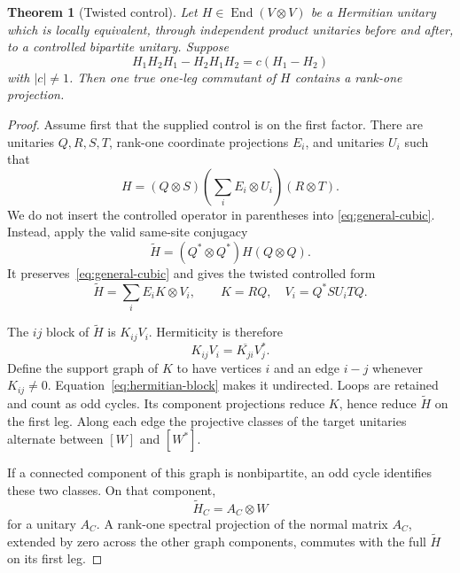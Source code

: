\documentclass[11pt]{article}
\newtheorem{theorem}{Theorem}[section]
\theoremstyle{definition}
\theoremstyle{remark}
\newcommand{\End}{\operatorname{End}}
\begin{document}
\begin{theorem}[Twisted control]\label{thm:twisted-control}
Let \(H\in\End(V\otimes V)\) be a Hermitian unitary which is locally
equivalent, through independent product unitaries before and after, to a
controlled bipartite unitary. Suppose
\begin{equation}
  H_1H_2H_1-H_2H_1H_2=c(H_1-H_2)
  \label{eq:general-cubic}
\end{equation}
with \(|c|\ne1\). Then one true one-leg commutant of \(H\) contains a
rank-one projection.
\end{theorem}

\begin{proof}
Assume first that the supplied control is on the first factor. There are
unitaries \(Q,R,S,T\), rank-one coordinate projections \(E_i\), and
unitaries \(U_i\) such that
\begin{equation}
  H=(Q\otimes S)
    \left(\sum_iE_i\otimes U_i\right)
    (R\otimes T).
  \label{eq:four-local}
\end{equation}
We do not insert the controlled operator in parentheses into
\eqref{eq:general-cubic}. Instead, apply the valid same-site conjugacy
\[
  \widetilde H=(Q^*\otimes Q^*)H(Q\otimes Q).
\]
It preserves~\eqref{eq:general-cubic} and gives the twisted controlled
form
\begin{equation}
  \widetilde H=\sum_iE_iK\otimes V_i,
  \qquad K=RQ,\quad V_i=Q^*SU_iTQ.
  \label{eq:twisted-form}
\end{equation}

The \(ij\) block of \(\widetilde H\) is \(K_{ij}V_i\). Hermiticity is
therefore
\begin{equation}
  K_{ij}V_i=\overline{K_{ji}}V_j^*.
  \label{eq:hermitian-block}
\end{equation}
Define the support graph of \(K\) to have vertices \(i\) and an edge
\(i\!-\!j\) whenever \(K_{ij}\ne0\). Equation~\eqref{eq:hermitian-block}
makes it undirected. Loops are retained and count as odd cycles. Its
component projections reduce \(K\), hence reduce \(\widetilde H\) on the
first leg. Along each edge the projective classes of the target unitaries
alternate between \([W]\) and \([W^*]\).

If a connected component of this graph is nonbipartite, an odd cycle
identifies these two classes. On that component,
\[
  \widetilde H_C=A_C\otimes W
\]
for a unitary \(A_C\). A rank-one spectral projection of the normal
matrix \(A_C\), extended by zero across the other graph components,
commutes with the full \(\widetilde H\) on its first leg.


\end{proof}
\end{document}

